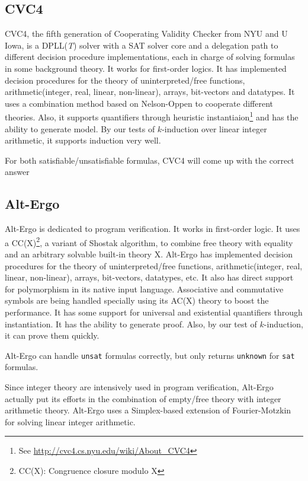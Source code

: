 \documentclass[10pt,twocolumn,letter]{article}
\theoremstyle{definition}
\begin{document}
\subsection{CVC4}

CVC4, the fifth generation of Cooperating Validity Checker from NYU and U Iowa, is a DPLL({\it T}) solver with a SAT solver core and a delegation path to different decision procedure implementations, each in charge of solving formulas in some background theory\cite{barrett:cvc4:2011}. It works for first-order logics. It has implemented decision procedures for the theory of uninterpreted/free functions, arithmetic(integer, real, linear, non-linear), arrays, bit-vectors and datatypes. It uses a combination method based on Nelson-Oppen to cooperate different theories. Also, it supports quantifiers through heuristic instantiaion\footnote{See \url{http://cvc4.cs.nyu.edu/wiki/About_CVC4}} and has the ability to generate model. By our tests of $k$-induction over linear integer arithmetic, it supports induction very well.

For both satisfiable/unsatisfiable formulas, CVC4 will come up with the correct answer

\subsection{Alt-Ergo}

Alt-Ergo is dedicated to program verification. It works in first-order logic. It uses a CC(X)\footnote{CC(X): Congruence closure modulo X}, a variant of Shostak algorithm, to combine free theory with equality and an arbitrary solvable built-in theory X\cite{conchonHDR2012}. Alt-Ergo has implemented decision procedures for the theory of uninterpreted/free functions, arithmetic(integer, real, linear, non-linear), arrays, bit-vectors, datatypes, etc. It also has direct support for polymorphism in its native input language. Associative and commutative symbols are being handled specially using its AC(X) theory to boost the performance. It has some support for universal and existential quantifiers through instantiation. It has the ability to generate proof. Also, by our test of $k$-induction, it can prove them quickly.

Alt-Ergo can handle {\tt unsat} formulas correctly, but only returns {\tt unknown} for {\tt sat} formulas.

Since integer theory are intensively used in program verification, Alt-Ergo actually put its efforts in the combination of empty/free theory with integer arithmetic theory. Alt-Ergo uses a Simplex-based extension of Fourier-Motzkin for solving linear integer arithmetic\cite{bobot:hal-00687640}.
\end{document}
